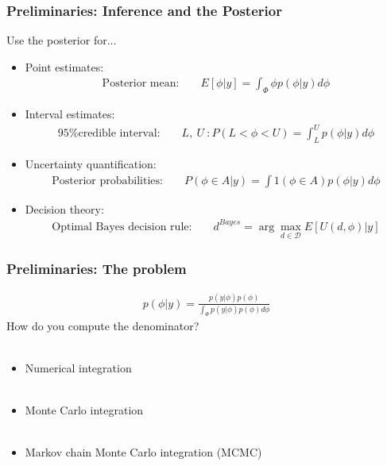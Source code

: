 \documentclass[xcolor=dvipsnames]{beamer}
\begin{document}
\begin{frame}
\frametitle{Preliminaries: Inference and the Posterior}
Use the posterior for...

\begin{itemize}
\item Point estimates: 
\begin{align*}
\mbox{Posterior mean: } && E[\phi|y]=\int_{\Phi}\phi p(\phi|y) d\phi
\end{align*}
\pause \item Interval estimates:
\begin{align*}
\mbox{95\% credible interval: } && L,\ U\ : P(L<\phi < U) = \int_{L}^{U}p(\phi|y)d\phi
\end{align*}
\pause \item Uncertainty quantification:
\begin{align*}
\mbox{Posterior probabilities: } && P(\phi \in A|y) = \int 1(\phi\in A) p(\phi|y)d\phi
\end{align*}
\pause \item Decision theory:
\begin{align*}
\mbox{Optimal Bayes decision rule: } && d^{Bayes} = \arg\max_{d\in\mathcal{D}}E[U(d,\phi)|y]
\end{align*}
\end{itemize}

\end{frame}

\begin{frame}
\frametitle{Preliminaries: The problem}
\begin{align*}
p(\phi|y) = \frac{p(y|\phi)p(\phi)}{\int_{\Phi}p(y|\phi)p(\phi)d\phi}
\end{align*}
How do you compute the denominator?\\~\\

\pause 
\begin{itemize}
\item Numerical integration\\~\\
\pause \item Monte Carlo integration\\~\\
\pause \item Markov chain Monte Carlo integration (MCMC)
\end{itemize}
\end{frame}
\end{document}
